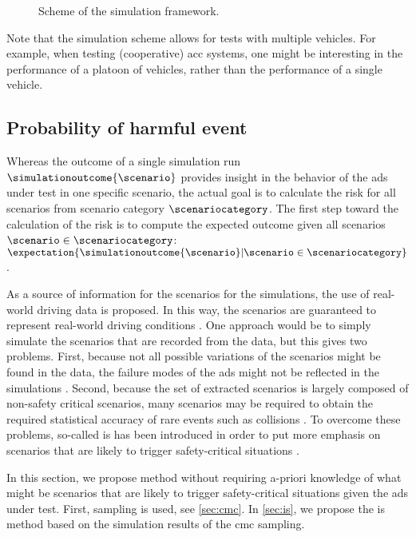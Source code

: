 \begin{figure}
	\centering
	
	\caption{Scheme of the simulation framework.}
	\label{fig:simulation scheme}
\end{figure}

Note that the simulation scheme allows for tests with multiple vehicles.
For example, when testing (cooperative) \ac{acc} systems, one might be interesting in the performance of a platoon of vehicles, rather than the performance of a single vehicle.



\subsection{Probability of harmful event}
\label{sec:harmful}

Whereas the outcome of a single simulation run $\simulationoutcome{\scenario}$ provides insight in the behavior of the \ac{ads} under test in one specific scenario, the actual goal is to calculate the risk for all scenarios from scenario category $\scenariocategory$. 
The first step toward the calculation of the risk is to compute the expected outcome given all scenarios $\scenario\in\scenariocategory$: $\expectation{\simulationoutcome{\scenario}|\scenario\in\scenariocategory}$.

As a source of information for the scenarios for the simulations, the use of real-world driving data is proposed.
In this way, the scenarios are guaranteed to represent real-world driving conditions \autocite{elrofai2018scenario, putz2017pegasus, krajewski2018highD}.
One approach would be to simply simulate the scenarios that are recorded from the data, but this gives two problems.
First, because not all possible variations of the scenarios might be found in the data, the failure modes of the \ac{ads} might not be reflected in the simulations \autocite{zhao2018evaluation}.
Second, because the set of extracted scenarios is largely composed of non-safety critical scenarios, many scenarios may be required to obtain the required statistical accuracy of rare events such as collisions \autocite{zhao2018evaluation, jesenski2020scalable}.
To overcome these problems, so-called \ac{is} has been introduced in order to put more emphasis on scenarios that are likely to trigger safety-critical situations \autocite{zhao2018evaluation, xu2018accelerated, jesenski2020scalable}.

In this section, we propose  method without requiring a-priori knowledge of what might be scenarios that are likely to trigger safety-critical situations given the \ac{ads} under test.
First,  sampling is used, see \cref{sec:cmc}.
In \cref{sec:is}, we propose the \ac{is} method based on the simulation results of the \ac{cmc} sampling.



